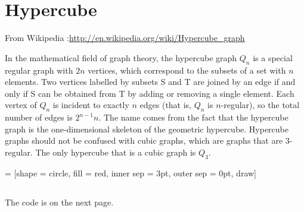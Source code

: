 \newpage\section{Hypercube}
From Wikipedia :\url{http://en.wikipedia.org/wiki/Hypercube_graph}

In the mathematical field of graph theory, the hypercube graph $Q_n$ is a  special regular graph with $2n$ vertices, which correspond to the subsets of a set with $n$ elements. Two vertices labelled by subsets S and T are joined by an edge if and only if S can be obtained from T by adding or removing a single element. Each vertex of $Q_n$ is incident to exactly $n$ edges (that is, $Q_n$ is $n$-regular), so the total number of edges is $2^{n-1}n$.
The name comes from the fact that the hypercube graph is the one-dimensional skeleton of the geometric hypercube.
Hypercube graphs should not be confused with cubic graphs, which are graphs that are 3-regular. The only hypercube that is a cubic graph is $Q_3$.

       = [shape        = circle,%
                                 fill         = red,%
                                 inner sep    = 3pt,%
                                 outer sep    = 0pt,%
                                 draw]
\SetVertexNoLabel

\subsection{ }

The code is on the next page.

\begin{center}
\begin{tkzexample}[vbox]
\end{tkzexample}
\end{center}
\endinput